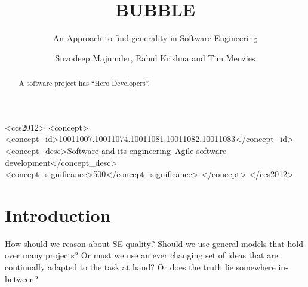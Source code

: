 \documentclass[sigconf]{acmart}
\theoremstyle{break}
\begin{document}



\title{BUBBLE}
\subtitle{An Approach to find generality in Software Engineering}

\author{Suvodeep Majumder, Rahul Krishna and Tim Menzies}


\begin{abstract}
A  software project has ``Hero  Developers''.

\end{abstract}




\begin{CCSXML}
<ccs2012>
<concept>
<concept_id>10011007.10011074.10011081.10011082.10011083</concept_id>
<concept_desc>Software and its engineering~Agile software 
development</concept_desc>
<concept_significance>500</concept_significance>
</concept>
</ccs2012>
\end{CCSXML}





\maketitle

\pagestyle{plain}

\section{Introduction}
How should we reason about SE quality?  Should we use  general models that hold over many projects? Or must we use an ever changing set of ideas that are   continually adapted to the task at hand? 
Or does the truth lie somewhere in-between?  
\end{document}
